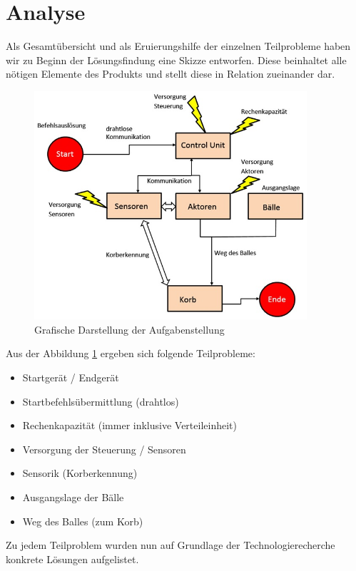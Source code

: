 \section{Analyse}
	Als Gesamtübersicht und als Eruierungshilfe der einzelnen Teilprobleme haben wir zu Beginn der Lösungsfindung eine Skizze entworfen. Diese beinhaltet alle nötigen Elemente des Produkts und stellt diese in Relation zueinander dar. 
	
	\begin{figure}[h!]
		\includegraphics[width=0.9\textwidth]{Morphologie/Bilder/Blockschaltbild.jpg}
		\centering
		\caption{Grafische Darstellung der Aufgabenstellung}
		\label{abb:Blockschaltbild} 
	\end{figure}
	
	Aus der Abbildung \ref{abb:Blockschaltbild} ergeben sich folgende Teilprobleme:
	\begin{itemize}
		\item Startgerät / Endgerät
		\item Startbefehlsübermittlung (drahtlos)
		\item Rechenkapazität (immer inklusive Verteileinheit)
		\item Versorgung der Steuerung / Sensoren
		\item Sensorik (Korberkennung)
		\item Ausgangslage der Bälle
		\item Weg des Balles (zum Korb)
	\end{itemize}
	Zu jedem Teilproblem wurden nun auf Grundlage der Technologierecherche konkrete Lösungen aufgelistet.
	
